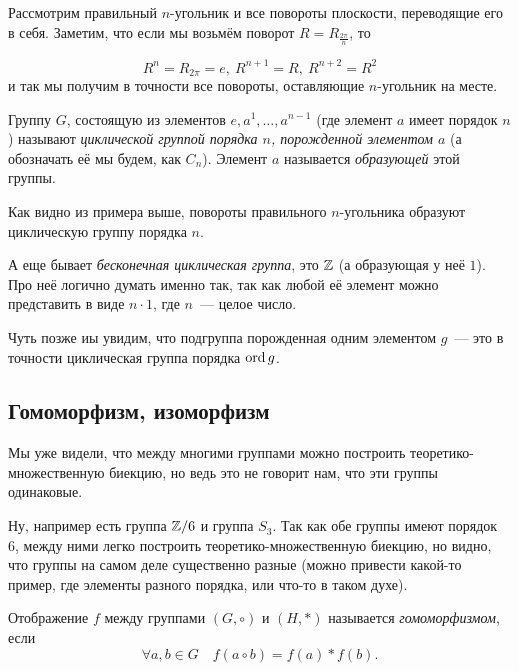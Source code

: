 	\begin{example}
		Рассмотрим правильный $n$-угольник и все повороты плоскости, переводящие его в себя. Заметим, что если мы возьмём поворот $R = R_{\frac{2\pi}{n}}$, то 

		\[
			R^n = R_{2\pi} = e,\  R^{n + 1} = R, \ R^{n + 2} = R^2 
		\]
		и так мы получим в точности все повороты, оставляющие $n$-угольник на месте. 
	\end{example}

	\begin{definition} 
		Группу $G$, состоящую из элементов $e, a^1, \ldots, a^{n - 1}$ (где элемент $a$ имеет порядок $n$) называют \emph{циклической группой порядка $n$, порожденной элементом $a$} (а обозначать её мы будем, как $C_n$). Элемент $a$ называется \emph{образующей} этой группы. 
	\end{definition}

	Как видно из примера выше, повороты правильного $n$-угольника образуют циклическую группу порядка $n$.

	\begin{remark}
		А еще бывает \emph{бесконечная циклическая группа}, это $\mathbb{Z}$ (а образующая у неё $1$). Про неё логично думать именно так, так как любой её элемент можно представить в виде $n \cdot 1$, где $n$~--- целое число.
	\end{remark}

	Чуть позже иы увидим, что подгруппа порожденная одним элементом $g$~--- это в точности циклическая группа порядка $\operatorname{ord}{g}$. 

	\subsection{Гомоморфизм, изоморфизм}

	Мы уже видели, что между многими группами можно построить теоретико-множественную биекцию, но ведь это не говорит нам, что эти группы одинаковые. 

	\begin{example}
		Ну, например есть группа $\mathbb{Z}/6$ и группа $S_{3}$. Так как обе группы имеют порядок 6, между ними легко построить теоретико-множественную биекцию, но видно, что группы на самом деле существенно разные (можно привести какой-то пример, где элементы разного порядка, или что-то в таком духе). 
	\end{example}

	\begin{definition} 
		Отображение $f$ между группами $(G, \circ)$ и $(H, *)$ называется \emph{гомоморфизмом}, если 
		\[
			\forall a, b \in G \quad  f(a \circ b) = f(a) * f(b).
		\]
	\end{definition}


